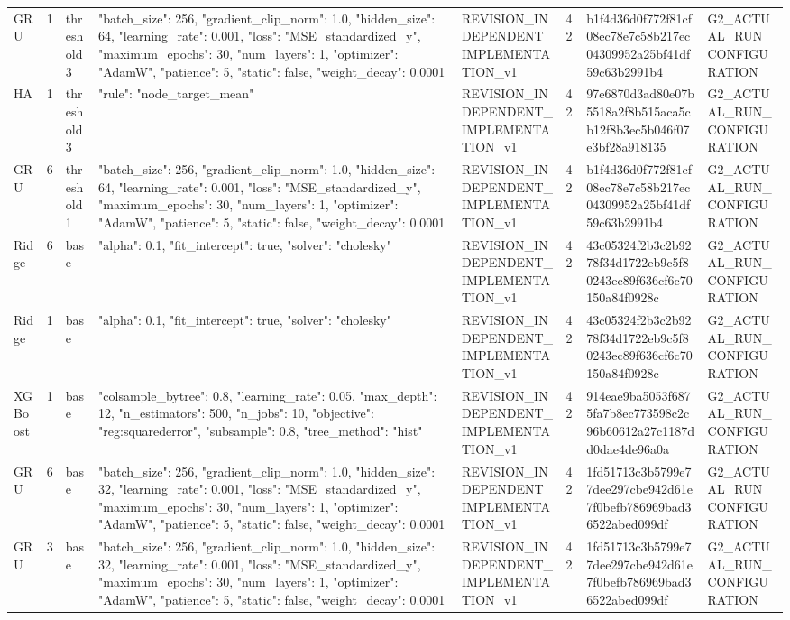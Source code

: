 \begin{longtable}{llllllll}
GRU & 1 & threshold3 & {"batch\_size": 256, "gradient\_clip\_norm": 1.0, "hidden\_size": 64, "learning\_rate": 0.001, "loss": "MSE\_standardized\_y", "maximum\_epochs": 30, "num\_layers": 1, "optimizer": "AdamW", "patience": 5, "static": false, "weight\_decay": 0.0001} & REVISION\_INDEPENDENT\_IMPLEMENTATION\_v1 & 42 & b1f4d36d0f772f81cf08ec78e7c58b217ec04309952a25bf41df59c63b2991b4 & G2\_ACTUAL\_RUN\_CONFIGURATION \\
HA & 1 & threshold3 & {"rule": "node\_target\_mean"} & REVISION\_INDEPENDENT\_IMPLEMENTATION\_v1 & 42 & 97e6870d3ad80e07b5518a2f8b515aca5cb12f8b3ec5b046f07e3bf28a918135 & G2\_ACTUAL\_RUN\_CONFIGURATION \\
GRU & 6 & threshold1 & {"batch\_size": 256, "gradient\_clip\_norm": 1.0, "hidden\_size": 64, "learning\_rate": 0.001, "loss": "MSE\_standardized\_y", "maximum\_epochs": 30, "num\_layers": 1, "optimizer": "AdamW", "patience": 5, "static": false, "weight\_decay": 0.0001} & REVISION\_INDEPENDENT\_IMPLEMENTATION\_v1 & 42 & b1f4d36d0f772f81cf08ec78e7c58b217ec04309952a25bf41df59c63b2991b4 & G2\_ACTUAL\_RUN\_CONFIGURATION \\
Ridge & 6 & base & {"alpha": 0.1, "fit\_intercept": true, "solver": "cholesky"} & REVISION\_INDEPENDENT\_IMPLEMENTATION\_v1 & 42 & 43c05324f2b3c2b9278f34d1722eb9c5f80243ec89f636cf6c70150a84f0928c & G2\_ACTUAL\_RUN\_CONFIGURATION \\
Ridge & 1 & base & {"alpha": 0.1, "fit\_intercept": true, "solver": "cholesky"} & REVISION\_INDEPENDENT\_IMPLEMENTATION\_v1 & 42 & 43c05324f2b3c2b9278f34d1722eb9c5f80243ec89f636cf6c70150a84f0928c & G2\_ACTUAL\_RUN\_CONFIGURATION \\
XGBoost & 1 & base & {"colsample\_bytree": 0.8, "learning\_rate": 0.05, "max\_depth": 12, "n\_estimators": 500, "n\_jobs": 10, "objective": "reg:squarederror", "subsample": 0.8, "tree\_method": "hist"} & REVISION\_INDEPENDENT\_IMPLEMENTATION\_v1 & 42 & 914eae9ba5053f6875fa7b8ec773598c2c96b60612a27c1187dd0dae4de96a0a & G2\_ACTUAL\_RUN\_CONFIGURATION \\
GRU & 6 & base & {"batch\_size": 256, "gradient\_clip\_norm": 1.0, "hidden\_size": 32, "learning\_rate": 0.001, "loss": "MSE\_standardized\_y", "maximum\_epochs": 30, "num\_layers": 1, "optimizer": "AdamW", "patience": 5, "static": false, "weight\_decay": 0.0001} & REVISION\_INDEPENDENT\_IMPLEMENTATION\_v1 & 42 & 1fd51713c3b5799e77dee297cbe942d61e7f0befb786969bad36522abed099df & G2\_ACTUAL\_RUN\_CONFIGURATION \\
GRU & 3 & base & {"batch\_size": 256, "gradient\_clip\_norm": 1.0, "hidden\_size": 32, "learning\_rate": 0.001, "loss": "MSE\_standardized\_y", "maximum\_epochs": 30, "num\_layers": 1, "optimizer": "AdamW", "patience": 5, "static": false, "weight\_decay": 0.0001} & REVISION\_INDEPENDENT\_IMPLEMENTATION\_v1 & 42 & 1fd51713c3b5799e77dee297cbe942d61e7f0befb786969bad36522abed099df & G2\_ACTUAL\_RUN\_CONFIGURATION \\

\end{longtable}
